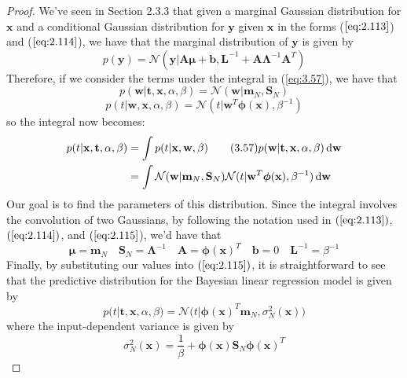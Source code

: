 \begin{proof}
    We've seen in Section 2.3.3 that given a marginal Gaussian distribution
    for $\mathbf{x}$ and a conditional Gaussian distribution for $\mathbf{y}$
    given $\mathbf{x}$ in the forms ($\ref{eq:2.113}$) and ($\ref{eq:2.114}$),
    we have that the marginal distribution of $\mathbf{y}$ is given by
    \begin{equation}\label{eq:2.115}\tag{2.115}
        p(\mathbf{y}) 
        = \mathcal{N}(\mathbf{y} | \mathbf{A}\bm{\mu} + \mathbf{b}, \mathbf{L}^{-1}
            + \mathbf{A\Lambda}^{-1} \mathbf{A}^T) 
    \end{equation}
    Therefore, if we consider the terms under the integral in (\ref{eq:3.57}),
    we have that
    \[
        p(\mathbf{w} | \mathbf{t}, \mathbf{x}, \alpha, \beta) 
        = \mathcal{N}(\mathbf{w} | \mathbf{m}_N, \mathbf{S}_N)
    \] 
    \[
        p(t | \mathbf{w}, \mathbf{x}, \alpha, \beta) 
        = \mathcal{N}(t | \mathbf{w}^T\bm{\phi}(\mathbf{x}), \beta^{-1}) 
    \] 
    so the integral now becomes:
    \begin{align*}
        p(t | \mathbf{x}, \mathbf{t}, \alpha, \beta)
        &= \int p(t | \mathbf{x}, \mathbf{w}, \beta) \label{eq:3.57} \tag{3.57}
            p(\mathbf{w} | \mathbf{t}, \mathbf{x}, \alpha, \beta) \mathop{}\!\mathrm{d} \mathbf{w} \\
        &= \int \mathcal{N}(\mathbf{w} | \mathbf{m}_N, \mathbf{S}_N)
        \mathcal{N}(t | \mathbf{w}^T\bm{\phi}(\mathbf{x}), \beta^{-1}) \mathop{}\!\mathrm{d} \mathbf{w}
    \end{align*}
    Our goal is to find the parameters of this distribution. Since 
    the integral involves the convolution of two Gaussians, by following
    the notation used in $(\ref{eq:2.113})$, $(\ref{eq:2.114})$, and $(\ref{eq:2.115}$),
    we'd have that
    \[
        \bm{\mu} = \mathbf{m}_N 
        \hspace{1em}
        \mathbf{S}_N = \mathbf{\Lambda}^{-1}
        \hspace{1em}
        \mathbf{A} = \bm{\phi}(\mathbf{x})^T
        \hspace{1em}
        \mathbf{b} = 0
        \hspace{1em}
        \mathbf{L}^{-1} = \beta^{-1}
    \] 
    Finally, by substituting our values into $(\ref{eq:2.115})$, it is 
    straightforward to see that the predictive distribution for the Bayesian 
    linear regression model is given by
    \begin{equation}\label{eq:3.58}\tag{3.58}
        p(t | \mathbf{t}, \mathbf{x}, \alpha, \beta) 
        = \mathcal{N}\big(t | \bm{\phi}(\mathbf{x})^T\mathbf{m}_N, \sigma^2_N(\mathbf{x})\big)
    \end{equation}
    where the input-dependent variance is given by
    \begin{equation}\label{eq:3.59}\tag{3.59}
        \sigma_{N}^2(\mathbf{x})
        = \frac{1}{\beta} + \bm{\phi}(\mathbf{x})\mathbf{S}_N\bm{\phi}(\mathbf{x})^T
    \end{equation}
\end{proof}

